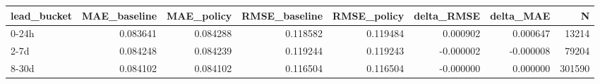 \begin{tabular}{lrrrrrrr}
\toprule
lead_bucket & MAE_baseline & MAE_policy & RMSE_baseline & RMSE_policy & delta_RMSE & delta_MAE & N \\
\midrule
0-24h & 0.083641 & 0.084288 & 0.118582 & 0.119484 & 0.000902 & 0.000647 & 13214 \\
2-7d & 0.084248 & 0.084239 & 0.119244 & 0.119243 & -0.000002 & -0.000008 & 79204 \\
8-30d & 0.084102 & 0.084102 & 0.116504 & 0.116504 & -0.000000 & 0.000000 & 301590 \\
\bottomrule
\end{tabular}
